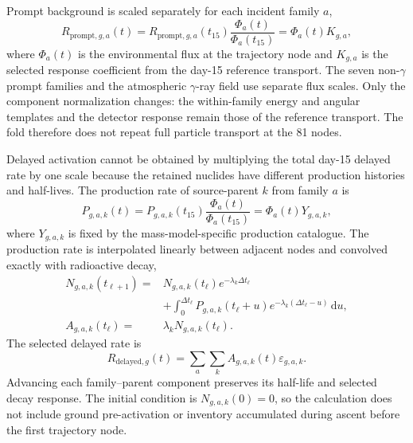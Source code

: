 \documentclass[11pt]{article}
\newcommand{\revblue}[1]{\textcolor{revisionblue}{#1}}
\begin{document}
Prompt background is scaled separately for each incident family $a$,
\begin{equation}
 R_{\mathrm{prompt},g,a}(t)
 =R_{\mathrm{prompt},g,a}(t_{15})
 \frac{\Phi_a(t)}{\Phi_a(t_{15})}
 =\Phi_a(t)K_{g,a},
 \label{eq:prompt_source_response}
\end{equation}
where $\Phi_a(t)$ is the environmental flux at the trajectory node and
$K_{g,a}$ is the selected response coefficient from the day-15 reference
transport. The seven non-$\gamma$ prompt families and the \revblue{atmospheric
$\gamma$-ray field} use separate flux scales. Only the component normalization
changes: the within-family energy and angular templates and the detector
response remain those of the reference transport. The fold therefore does not
repeat full particle transport at the 81 nodes.

Delayed activation cannot be obtained by multiplying the total day-15 delayed
rate by one scale because the retained nuclides have different production
histories and half-lives. The production rate of source-parent $k$ from family
$a$ is
\begin{equation}
 P_{g,a,k}(t)
 =P_{g,a,k}(t_{15})\frac{\Phi_a(t)}{\Phi_a(t_{15})}
 =\Phi_a(t)Y_{g,a,k},
 \label{eq:activation_production}
\end{equation}
where $Y_{g,a,k}$ is fixed by the mass-model-specific production catalogue.
The production rate is interpolated linearly between adjacent nodes and
convolved exactly with radioactive decay,
\begin{equation}
 \begin{aligned}
 N_{g,a,k}(t_{\ell+1})={}&N_{g,a,k}(t_\ell)e^{-\lambda_k\Delta t_\ell}\\
 &+\int_0^{\Delta t_\ell}P_{g,a,k}(t_\ell+u)
 e^{-\lambda_k(\Delta t_\ell-u)}\,\mathrm du,\\
 A_{g,a,k}(t_\ell)={}&\lambda_kN_{g,a,k}(t_\ell).
 \end{aligned}
 \label{eq:delayed_inventory}
\end{equation}
The selected delayed rate is
\begin{equation}
 R_{\mathrm{delayed},g}(t)=
 \sum_a\sum_k A_{g,a,k}(t)\varepsilon_{g,a,k}.
 \label{eq:delayed_selected}
\end{equation}
Advancing each family--parent component preserves its half-life and selected
decay response. The initial condition is $N_{g,a,k}(0)=0$, so the calculation
does not include ground pre-activation or inventory accumulated during ascent
before the first trajectory node.
\end{document}
